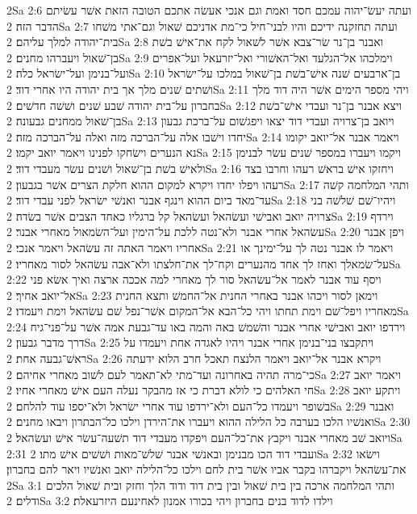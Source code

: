 2Sa 2:6  ועתה יעשׂ־יהוה עמכם חסד ואמת וגם אנכי אעשׂה אתכם הטובה הזאת אשׁר עשׂיתם הדבר הזה׃
2Sa 2:7  ועתה תחזקנה ידיכם והיו לבני־חיל כי־מת אדניכם שׁאול וגם־אתי משׁחו בית־יהודה למלך עליהם׃
2Sa 2:8  ואבנר בן־נר שׂר־צבא אשׁר לשׁאול לקח את־אישׁ בשׁת בן־שׁאול ויעברהו מחנים׃
2Sa 2:9  וימלכהו אל־הגלעד ואל־האשׁורי ואל־יזרעאל ועל־אפרים ועל־בנימן ועל־ישׂראל כלה׃
2Sa 2:10  בן־ארבעים שׁנה אישׁ־בשׁת בן־שׁאול במלכו על־ישׂראל ושׁתים שׁנים מלך אך בית יהודה היו אחרי דוד׃
2Sa 2:11  ויהי מספר הימים אשׁר היה דוד מלך בחברון על־בית יהודה שׁבע שׁנים ושׁשׁה חדשׁים׃
2Sa 2:12  ויצא אבנר בן־נר ועבדי אישׁ־בשׁת בן־שׁאול ממחנים גבעונה׃
2Sa 2:13  ויואב בן־צרויה ועבדי דוד יצאו ויפגשׁום על־ברכת גבעון יחדו וישׁבו אלה על־הברכה מזה ואלה על־הברכה מזה׃
2Sa 2:14  ויאמר אבנר אל־יואב יקומו נא הנערים וישׂחקו לפנינו ויאמר יואב יקמו׃
2Sa 2:15  ויקמו ויעברו במספר שׁנים עשׂר לבנימן ולאישׁ בשׁת בן־שׁאול ושׁנים עשׂר מעבדי דוד׃
2Sa 2:16  ויחזקו אישׁ בראשׁ רעהו וחרבו בצד רעהו ויפלו יחדו ויקרא למקום ההוא חלקת הצרים אשׁר בגבעון׃
2Sa 2:17  ותהי המלחמה קשׁה עד־מאד ביום ההוא וינגף אבנר ואנשׁי ישׂראל לפני עבדי דוד׃
2Sa 2:18  ויהיו־שׁם שׁלשׁה בני צרויה יואב ואבישׁי ועשׂהאל ועשׂהאל קל ברגליו כאחד הצבים אשׁר בשׂדה׃
2Sa 2:19  וירדף עשׂהאל אחרי אבנר ולא־נטה ללכת על־הימין ועל־השׂמאול מאחרי אבנר׃
2Sa 2:20  ויפן אבנר אחריו ויאמר האתה זה עשׂהאל ויאמר אנכי׃
2Sa 2:21  ויאמר לו אבנר נטה לך על־ימינך או על־שׂמאלך ואחז לך אחד מהנערים וקח־לך את־חלצתו ולא־אבה עשׂהאל לסור מאחריו׃
2Sa 2:22  ויסף עוד אבנר לאמר אל־עשׂהאל סור לך מאחרי למה אככה ארצה ואיך אשׂא פני אל־יואב אחיך׃
2Sa 2:23  וימאן לסור ויכהו אבנר באחרי החנית אל־החמשׁ ותצא החנית מאחריו ויפל־שׁם וימת תחתו ויהי כל־הבא אל־המקום אשׁר־נפל שׁם עשׂהאל וימת ויעמדו׃
2Sa 2:24  וירדפו יואב ואבישׁי אחרי אבנר והשׁמשׁ באה והמה באו עד־גבעת אמה אשׁר על־פני־גיח דרך מדבר גבעון׃
2Sa 2:25  ויתקבצו בני־בנימן אחרי אבנר ויהיו לאגדה אחת ויעמדו על ראשׁ־גבעה אחת׃
2Sa 2:26  ויקרא אבנר אל־יואב ויאמר הלנצח תאכל חרב הלוא ידעתה כי־מרה תהיה באחרונה ועד־מתי לא־תאמר לעם לשׁוב מאחרי אחיהם׃
2Sa 2:27  ויאמר יואב חי האלהים כי לולא דברת כי אז מהבקר נעלה העם אישׁ מאחרי אחיו׃
2Sa 2:28  ויתקע יואב בשׁופר ויעמדו כל־העם ולא־ירדפו עוד אחרי ישׂראל ולא־יספו עוד להלחם׃
2Sa 2:29  ואבנר ואנשׁיו הלכו בערבה כל הלילה ההוא ויעברו את־הירדן וילכו כל־הבתרון ויבאו מחנים׃
2Sa 2:30  ויואב שׁב מאחרי אבנר ויקבץ את־כל־העם ויפקדו מעבדי דוד תשׁעה־עשׂר אישׁ ועשׂהאל׃
2Sa 2:31  ועבדי דוד הכו מבנימן ובאנשׁי אבנר שׁלשׁ־מאות ושׁשׁים אישׁ מתו׃
2Sa 2:32  וישׂאו את־עשׂהאל ויקברהו בקבר אביו אשׁר בית לחם וילכו כל־הלילה יואב ואנשׁיו ויאר להם בחברון׃
2Sa 3:1  ותהי המלחמה ארכה בין בית שׁאול ובין בית דוד ודוד הלך וחזק ובית שׁאול הלכים ודלים׃
2Sa 3:2  וילדו לדוד בנים בחברון ויהי בכורו אמנון לאחינעם היזרעאלת׃
